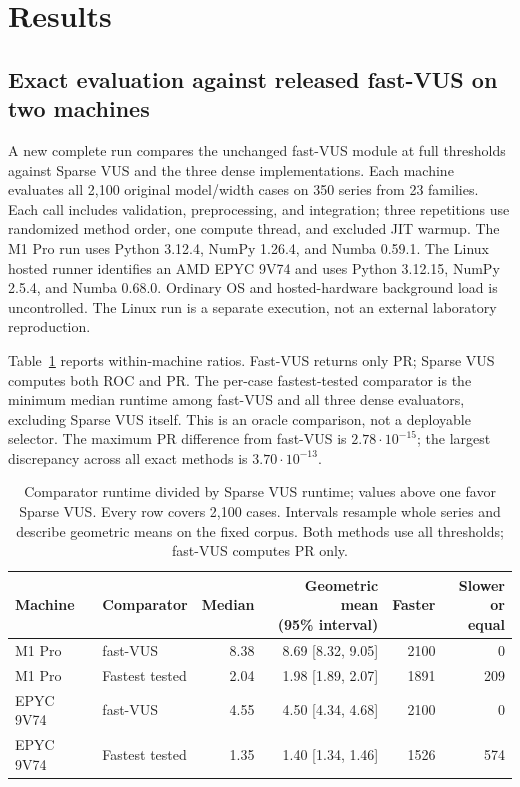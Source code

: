 \section{Results}
\subsection{Exact evaluation against released fast-VUS on two machines}
A new complete run compares the unchanged fast-VUS module at full thresholds
against Sparse VUS and the three dense implementations. Each machine evaluates
all 2,100 original model/width cases on 350 series from 23 families. Each call
includes validation, preprocessing, and integration; three repetitions use
randomized method order, one compute thread, and excluded JIT warmup.
The M1 Pro run uses Python 3.12.4, NumPy 1.26.4, and Numba 0.59.1.
The Linux hosted runner identifies an AMD EPYC 9V74 and uses Python 3.12.15,
NumPy 2.5.4, and Numba 0.68.0. Ordinary OS and hosted-hardware background load
is uncontrolled. The Linux run is a separate execution, not an external
laboratory reproduction.

Table~\ref{tab:fast-vus} reports within-machine ratios. Fast-VUS returns only
PR; Sparse VUS computes both ROC and PR. The per-case fastest-tested comparator
is the minimum median runtime among fast-VUS and all three dense evaluators,
excluding Sparse VUS itself. This is an oracle comparison, not a deployable
selector. The maximum PR difference from fast-VUS is $2.78\cdot10^{-15}$;
the largest discrepancy across all exact methods is $3.70\cdot10^{-13}$.

\begin{table}[t]
\centering
\begin{tabular}{llrrrr}
\toprule
Machine & Comparator & Median & \shortstack{Geometric mean\\(95\% interval)} & Faster & \shortstack{Slower\\or equal}\\
\midrule
M1 Pro & fast-VUS & 8.38 & 8.69 [8.32, 9.05] & 2100 & 0 \\
M1 Pro & Fastest tested & 2.04 & 1.98 [1.89, 2.07] & 1891 & 209 \\
EPYC 9V74 & fast-VUS & 4.55 & 4.50 [4.34, 4.68] & 2100 & 0 \\
EPYC 9V74 & Fastest tested & 1.35 & 1.40 [1.34, 1.46] & 1526 & 574 \\
\bottomrule
\end{tabular}
\caption{Comparator runtime divided by Sparse VUS runtime; values above one
favor Sparse VUS. Every row covers 2,100 cases. Intervals resample whole series
and describe geometric means on the fixed corpus. Both methods use all
thresholds; fast-VUS computes PR only.}
\label{tab:fast-vus}
\end{table}

